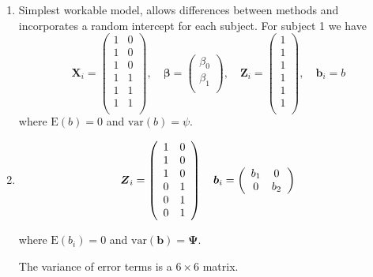 \documentclass[12pt, a4paper]{article}
\begin{document}
\begin{enumerate}


\item Simplest workable model, allows differences between methods
and incorporates a random intercept for each subject. For subject
1 we have
\[
\boldsymbol{X}_i =
\left(%
\begin{array}{cc}
  1 & 0 \\
  1 & 0 \\
  1 & 0 \\
  1 & 1 \\
  1 & 1 \\
  1 & 1 \\
\end{array}%
\right),\quad
\boldsymbol{\beta} =
\left(%
\begin{array}{c}
  \beta_0 \\
  \beta_1 \\
\end{array}%
\right), \quad
\boldsymbol{Z}_i =
\left(%
\begin{array}{c}
  1 \\
  1 \\
  1 \\
  1 \\
  1 \\
  1 \\
\end{array}%
\right), \quad \boldsymbol{b}_i = b
\]
where $\mathrm{E}(b)=0$ and $\mathrm{var}(b)=\psi.$

\item
\[
\boldsymbol{Z}_i =
\left(%
\begin{array}{c c}
  1 & 0 \\
  1 & 0 \\
  1 & 0 \\
  0 & 1 \\
  0 & 1 \\
  0 & 1 \\
\end{array}%
\right)
\quad \boldsymbol{b}_i =
\left(%
\begin{array}{c c}
  b_1 & 0  \\
  0 & b_2  \\
\end{array}%
\right)
\]

where $\mathrm{E}(b_i)=0$ and $\mathrm{var}(\boldsymbol{b})=
\boldsymbol{\Psi}$.

The variance of error terms is a $6 \times 6$ matrix.

\end{enumerate}
\end{document}
